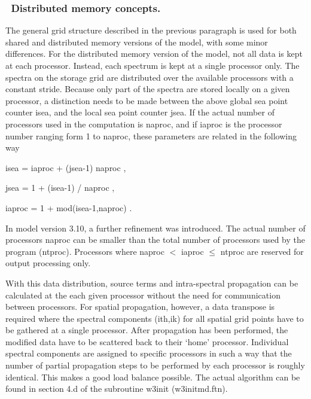 \vsssub
\subsubsection{~Distributed memory concepts.} \label{sec:distr}
\vsssub

The general grid structure described in the previous paragraph is used for
both shared and distributed memory versions of the model, with some minor
differences. For the distributed memory version of the model, not all data is
kept at each processor. Instead, each spectrum is kept at a single processor
only. The spectra on the storage grid are distributed over the available
processors with a constant stride. Because only part of the spectra are stored
locally on a given processor, a distinction needs to be made between the above
global sea point counter {\F isea}, and the local sea point counter {\F
jsea}. If the actual number of processors used in the computation is {\F
naproc}, and if {\F iaproc} is the processor number ranging form 1 to {\F
naproc}, these parameters are related in the following way

\vspace{\baselineskip}
\centerline{\F isea = iaproc + (jsea-1) naproc ,}
\centerline{\F jsea = 1 + (isea-1) / naproc ,}
\centerline{\F iaproc = 1 + mod(isea-1,naproc) .}
\vspace{\baselineskip}

In model version 3.10, a further refinement was introduced. The actual number
of processors {\F naproc} can be smaller than the total number of processors
used by the program ({\F ntproc}). Processors where {\F naproc} $<$ {\F
iaproc} $\le$ {\F ntproc} are reserved for output processing only.

With this data distribution, source terms and intra-spectral propagation can
be calculated at the each given processor without the need for communication
between processors. For spatial propagation, however, a data transpose is
required where the spectral components {\F(ith,ik)} for all spatial grid
points have to be gathered at a single processor. After propagation has been
performed, the modified data have to be scattered back to their `home'
processor. Individual spectral components are assigned to specific processors
in such a way that the number of partial propagation steps to be performed by
each processor is roughly identical. This makes a good load balance
possible. The actual algorithm can be found in section 4.d of the subroutine
{\F w3init} ({\file w3initmd.ftn}).

